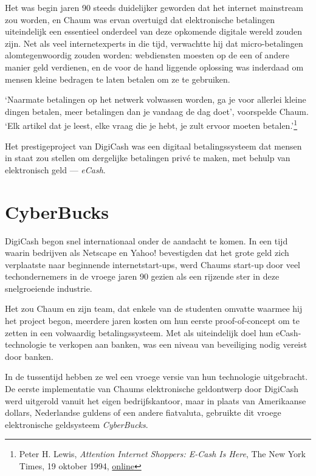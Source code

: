 \documentclass[
  a5paper,
  smalldemyvopaper,11pt,twoside,onecolumn,openright,extrafontsizes,
hidelinks]{memoir}
\begin{document}
Het was begin jaren 90 steeds duidelijker geworden dat het internet
mainstream zou worden, en Chaum was ervan overtuigd dat elektronische
betalingen uiteindelijk een essentieel onderdeel van deze opkomende
digitale wereld zouden zijn. Net als veel internetexperts in die tijd,
verwachtte hij dat micro-betalingen alomtegenwoordig zouden worden:
webdiensten moesten op de een of andere manier geld verdienen, en de
voor de hand liggende oplossing was inderdaad om mensen kleine bedragen
te laten betalen om ze te gebruiken.

`Naarmate betalingen op het netwerk volwassen worden, ga je voor
allerlei kleine dingen betalen, meer betalingen dan je vandaag de dag
doet', voorspelde Chaum. `Elk artikel dat je leest, elke vraag die je
hebt, je zult ervoor moeten betalen.'\footnote{Peter H. Lewis,
  \emph{Attention Internet Shoppers: E-Cash Is Here}, The New York
  Times, 19 oktober 1994,
  \href{https://www.nytimes.com/1994/10/19/business/attention-internet-shoppers-e-cash-is-here.html}{online}}

Het prestigeproject van DigiCash was een digitaal betalingssysteem dat
mensen in staat zou stellen om dergelijke betalingen privé te maken, met
behulp van elektronisch geld --- \emph{eCash}.

\section{CyberBucks}\label{cyberbucks}

DigiCash begon snel internationaal onder de aandacht te komen. In een
tijd waarin bedrijven als Netscape en Yahoo! bevestigden dat het grote
geld zich verplaatste naar beginnende internetstart-ups, werd Chaums
start-up door veel techondernemers in de vroege jaren 90 gezien als een
rijzende ster in deze snelgroeiende industrie.

Het zou Chaum en zijn team, dat enkele van de studenten omvatte waarmee
hij het project begon, meerdere jaren kosten om hun eerste
proof-of-concept om te zetten in een volwaardig betalingssysteem. Met
als uiteindelijk doel hun eCash-technologie te verkopen aan banken, was
een niveau van beveiliging nodig vereist door banken.

In de tussentijd hebben ze wel een vroege versie van hun technologie
uitgebracht. De eerste implementatie van Chaums elektronische
geldontwerp door DigiCash werd uitgerold vanuit het eigen
bedrijfskantoor, maar in plaats van Amerikaanse dollars, Nederlandse
guldens of een andere fiatvaluta, gebruikte dit vroege elektronische
geldsysteem \emph{CyberBucks}.
\end{document}
